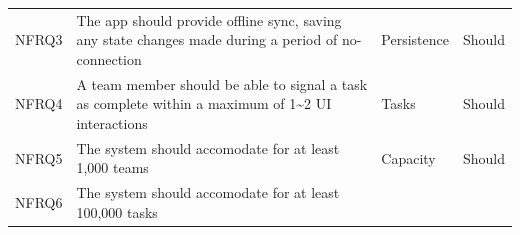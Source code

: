 \begin{longtable}[]{@{}llll@{}}
\begin{minipage}[t]{0.05\columnwidth}
NFRQ3\strut
\end{minipage} & \begin{minipage}[t]{0.63\columnwidth}\raggedright\strut
The app should provide offline sync, saving any state changes made
during a period of no-connection\strut
\end{minipage} & \begin{minipage}[t]{0.10\columnwidth}\raggedright\strut
Persistence\strut
\end{minipage} & \begin{minipage}[t]{0.11\columnwidth}\raggedright\strut
Should\strut
\end{minipage}\tabularnewline
\begin{minipage}[t]{0.05\columnwidth}\raggedright\strut
NFRQ4\strut
\end{minipage} & \begin{minipage}[t]{0.63\columnwidth}\raggedright\strut
A team member should be able to signal a task as complete within a
maximum of 1\textasciitilde{}2 UI interactions\strut
\end{minipage} & \begin{minipage}[t]{0.10\columnwidth}\raggedright\strut
Tasks\strut
\end{minipage} & \begin{minipage}[t]{0.11\columnwidth}\raggedright\strut
Should\strut
\end{minipage}\tabularnewline
\begin{minipage}[t]{0.05\columnwidth}\raggedright\strut
NFRQ5\strut
\end{minipage} & \begin{minipage}[t]{0.63\columnwidth}\raggedright\strut
The system should accomodate for at least 1,000 teams\strut
\end{minipage} & \begin{minipage}[t]{0.10\columnwidth}\raggedright\strut
Capacity\strut
\end{minipage} & \begin{minipage}[t]{0.11\columnwidth}\raggedright\strut
Should\strut
\end{minipage}\tabularnewline
\begin{minipage}[t]{0.05\columnwidth}\raggedright\strut
NFRQ6\strut
\end{minipage} & \begin{minipage}[t]{0.63\columnwidth}\raggedright\strut
The system should accomodate for at least 100,000 tasks\strut
\end{minipage} & \begin{minipage}[t]{0.10\columnwidth}\raggedright\strut

\end{minipage}
\end{longtable}
